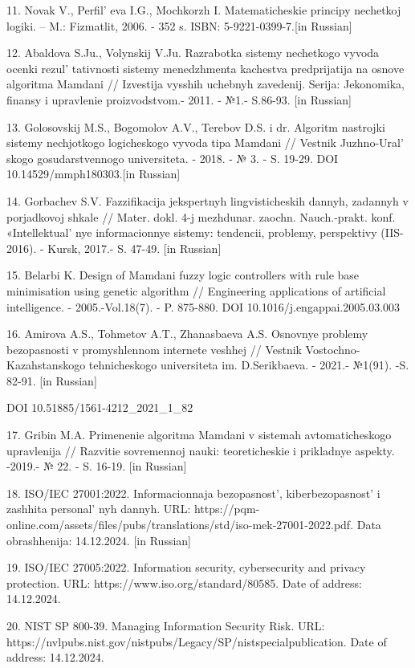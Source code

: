 11. Novak V., Perfil' eva I.G., Mochkorzh I.
Matematicheskie principy nechetkoj logiki. -- M.: Fizmatlit, 2006. - 352
s. ISBN: 5-9221-0399-7.{[}in Russian{]}

12. Abaldova S.Ju., Volynskij V.Ju. Razrabotka sistemy nechetkogo vyvoda
ocenki rezul' tativnosti sistemy menedzhmenta kachestva
predprijatija na osnove algoritma Mamdani // Izvestija vysshih uchebnyh
zavedenij. Serija: Jekonomika, finansy i upravlenie proizvodstvom.-
2011. - №1.- S.86-93. {[}in Russian{]}

13. Golosovskij M.S., Bogomolov A.V., Terebov D.S. i dr. Algoritm
nastrojki sistemy nechjotkogo logicheskogo vyvoda tipa Mamdani //
Vestnik Juzhno-Ural' skogo gosudarstvennogo universiteta.
- 2018. - № 3. - S. 19-29. DOI 10.14529/mmph180303.{[}in Russian{]}

14. Gorbachev S.V. Fazzifikacija jekspertnyh lingvisticheskih dannyh,
zadannyh v porjadkovoj shkale // Mater. dokl. 4-j mezhdunar. zaochn.
Nauch.-prakt. konf. «Intellektual' nye informacionnye
sistemy: tendencii, problemy, perspektivy (IIS-2016). - Kursk, 2017.- S.
47-49. {[}in Russian{]}

15. Belarbi K. Design of Mamdani fuzzy logic controllers with rule base
minimisation using genetic algorithm // Engineering applications of
artificial intelligence. - 2005.-Vol.18(7). - P. 875-880. DOI
10.1016/j.engappai.2005.03.003

16. Amirova A.S., Tohmetov A.T., Zhanasbaeva A.S. Osnovnye problemy
bezopasnosti v promyshlennom internete veshhej // Vestnik
Vostochno-Kazahstanskogo tehnicheskogo universiteta im. D.Serikbaeva. -
2021.- №1(91). -S. 82-91. {[}in Russian{]}

DOI 10.51885/1561-4212\_2021\_1\_82

17. Gribin M.A. Primenenie algoritma Mamdani v sistemah avtomaticheskogo
upravlenija // Razvitie sovremennoj nauki: teoreticheskie i prikladnye
aspekty. -2019.- № 22. - S. 16-19. {[}in Russian{]}

18. ISO/IEC 27001:2022. Informacionnaja bezopasnost',
kiberbezopasnost'{} i zashhita
personal' nyh dannyh. URL:
https://pqm-online.com/assets/files/pubs/translations/std/iso-mek-27001-2022.pdf.
Data obrashhenija: 14.12.2024. {[}in Russian{]}

19. ISO/IEC 27005:2022. Information security, cybersecurity and privacy
protection. URL: https://www.iso.org/standard/80585. Date of address:
14.12.2024.

20. NIST SP 800-39. Managing Information Security Risk. URL:
https://nvlpubs.nist.gov/nistpubs/Legacy/SP/nistspecialpublication. Date
of address: 14.12.2024.

